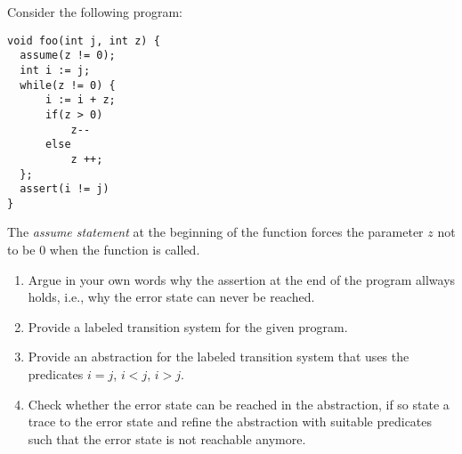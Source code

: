 Consider the following program:
\begin{verbatim}
void foo(int j, int z) {
  assume(z != 0);
  int i := j;
  while(z != 0) {
      i := i + z;
      if(z > 0)
          z--
      else
          z ++;
  };
  assert(i != j)
}
\end{verbatim}

The {\em assume statement} at the beginning of the function forces the parameter $z$ not to be 0 when the function is called.

\begin{enumerate}

 \item Argue in your own words why the assertion at the end of the program allways holds, i.e., why the error state can never be reached.

 \item Provide a labeled transition system for the given program.

 \item Provide an abstraction for the labeled transition system that uses the predicates $i = j$, $i < j$, $i > j$.

 \item Check whether the error state can be reached in the abstraction, if so state a trace to the error state and refine the abstraction with suitable predicates such that the error state is not reachable anymore.

\end{enumerate}



